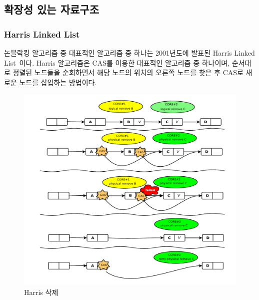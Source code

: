 \subsection{확장성 있는 자료구조}

\subsubsection{Harris Linked List}

논블락킹 알고리즘 중 대표적인 알고리즘 중 하나는 2001년도에 발표된 Harris Linked
List~\cite{Harris2001Lockfree}이다.
Harris 알고리즘은 CAS를 이용한 대표적인 알고리즘 중 하나이며, 순서대로 정렬된 노드들을 순회하면서 해당 
노드의 위치의 오른쪽 노드를 찾은 후 CAS로 새로운 노드를 삽입하는 방법이다. 

\begin{figure}[h!]
    \centering
    \includegraphics[width=1\textwidth]{fig/harris/harris}
    \caption{Harris 삭제}
  \label{fig:harris}
\end{figure}


